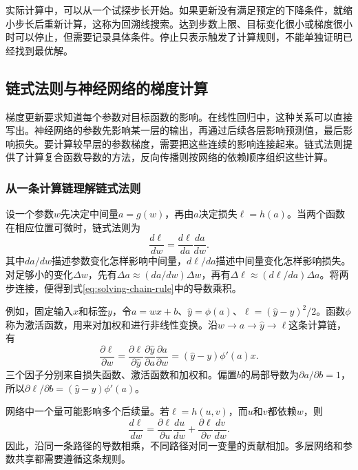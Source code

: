 实际计算中，可以从一个试探步长开始。如果更新没有满足预定的下降条件，就缩小步长后重新计算，这称为回溯线搜索。达到步数上限、目标变化很小或梯度很小时可以停止，但需要记录具体条件。停止只表示触发了计算规则，不能单独证明已经找到最优解。

\subsection{链式法则与神经网络的梯度计算}

梯度更新要求知道每个参数对目标函数的影响。在线性回归中，这种关系可以直接写出。神经网络的参数先影响某一层的输出，再通过后续各层影响预测值，最后影响损失。要计算较早层的参数梯度，需要把这些连续的影响连接起来。链式法则提供了计算复合函数导数的方法，反向传播则按网络的依赖顺序组织这些计算。

\subsubsection{从一条计算链理解链式法则}
设一个参数$w$先决定中间量$a=g(w)$，再由$a$决定损失$\ell=h(a)$。当两个函数在相应位置可微时，链式法则为
\begin{equation}
 \frac{d\ell}{dw}=\frac{d\ell}{da}\frac{da}{dw}.
 \label{eq:solving-chain-rule}
\end{equation}
其中$da/dw$描述参数变化怎样影响中间量，$d\ell/da$描述中间量变化怎样影响损失。对足够小的变化$\Delta w$，先有$\Delta a\approx(da/dw)\Delta w$，再有$\Delta\ell\approx(d\ell/da)\Delta a$。将两步连接，便得到式\eqref{eq:solving-chain-rule}中的导数乘积。

例如，固定输入$x$和标签$y$，令$a=wx+b$、$\hat y=\phi(a)$、$\ell=(\hat y-y)^2/2$。函数$\phi$称为激活函数，用来对加权和进行非线性变换。沿$w\to a\to\hat y\to\ell$这条计算链，有
\begin{equation}
 \frac{\partial\ell}{\partial w}
 =\frac{\partial\ell}{\partial\hat y}
  \frac{\partial\hat y}{\partial a}
  \frac{\partial a}{\partial w}
 =(\hat y-y)\phi'(a)x.
\end{equation}
三个因子分别来自损失函数、激活函数和加权和。偏置$b$的局部导数为$\partial a/\partial b=1$，所以$\partial\ell/\partial b=(\hat y-y)\phi'(a)$。

网络中一个量可能影响多个后续量。若$\ell=h(u,v)$，而$u$和$v$都依赖$w$，则
\begin{equation}
 \frac{d\ell}{dw}
 =\frac{\partial\ell}{\partial u}\frac{du}{dw}
 +\frac{\partial\ell}{\partial v}\frac{dv}{dw}.
\end{equation}
因此，沿同一条路径的导数相乘，不同路径对同一变量的贡献相加。多层网络和参数共享都需要遵循这条规则。

